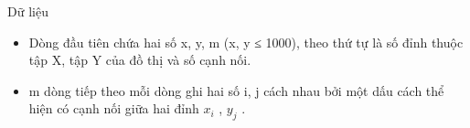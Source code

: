 Dữ liệu
\begin{itemize}
	\item     Dòng đầu tiên chứa hai số x, y, m  (x, y ≤ 1000), theo thứ tự là số đỉnh thuộc tập X, tập Y của đồ thị và số cạnh nối.   
	\item     m dòng tiếp theo mỗi dòng ghi hai số i, j cách nhau bởi một dấu cách thể hiện có cạnh nối giữa hai đỉnh $x_{i}$    , $y_{j}$    .   
\end{itemize}